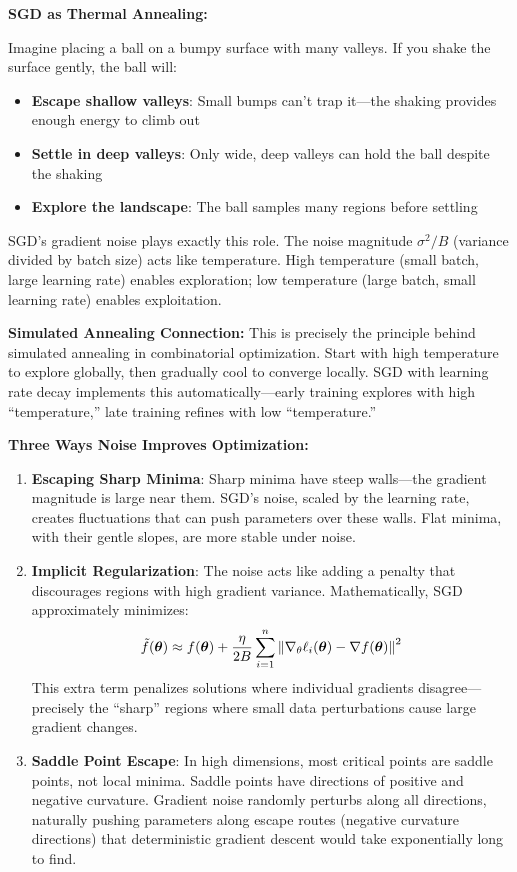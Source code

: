 \documentclass[../../main.tex]{subfiles}
\begin{document}
\begin{intuition}
\textbf{SGD as Thermal Annealing:}

Imagine placing a ball on a bumpy surface with many valleys. If you shake the surface gently, the ball will:
\begin{itemize}
    \item \textbf{Escape shallow valleys}: Small bumps can't trap it---the shaking provides enough energy to climb out
    \item \textbf{Settle in deep valleys}: Only wide, deep valleys can hold the ball despite the shaking
    \item \textbf{Explore the landscape}: The ball samples many regions before settling
\end{itemize}

SGD's gradient noise plays exactly this role. The noise magnitude $\sigma^2/B$ (variance divided by batch size) acts like temperature. High temperature (small batch, large learning rate) enables exploration; low temperature (large batch, small learning rate) enables exploitation.

\textbf{Simulated Annealing Connection:} This is precisely the principle behind simulated annealing in combinatorial optimization. Start with high temperature to explore globally, then gradually cool to converge locally. SGD with learning rate decay implements this automatically---early training explores with high ``temperature,'' late training refines with low ``temperature.''
\end{intuition}

\begin{keyconcept}
\textbf{Three Ways Noise Improves Optimization:}

\begin{enumerate}
    \item \textbf{Escaping Sharp Minima}: Sharp minima have steep walls---the gradient magnitude is large near them. SGD's noise, scaled by the learning rate, creates fluctuations that can push parameters over these walls. Flat minima, with their gentle slopes, are more stable under noise.

    \item \textbf{Implicit Regularization}: The noise acts like adding a penalty that discourages regions with high gradient variance. Mathematically, SGD approximately minimizes:
    \[
        \tilde{f}(\boldsymbol{\theta}) \approx f(\boldsymbol{\theta}) + \frac{\eta}{2B} \sum_{i=1}^n \left\lVert \nabla_\theta \ell_i(\boldsymbol{\theta}) - \nabla f(\boldsymbol{\theta}) \right\rVert^2
    \]
    This extra term penalizes solutions where individual gradients disagree---precisely the ``sharp'' regions where small data perturbations cause large gradient changes.

    \item \textbf{Saddle Point Escape}: In high dimensions, most critical points are saddle points, not local minima. Saddle points have directions of positive and negative curvature. Gradient noise randomly perturbs along all directions, naturally pushing parameters along escape routes (negative curvature directions) that deterministic gradient descent would take exponentially long to find.
\end{enumerate}
\end{keyconcept}
\end{document}
